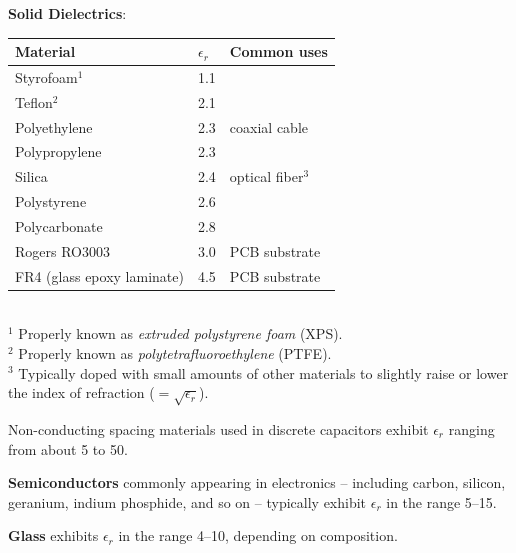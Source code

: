 \vfill\break
{\bf Solid Dielectrics}:
%
\begin{tabular}{lll}
Material                   & $\epsilon_r$ & Common uses \\
\hline
Styrofoam$^1$              & 1.1 & \\ \index{styrofoam} %
Teflon$^2$                 & 2.1 & \\ \index{Teflon} %
Polyethylene               & 2.3 & coaxial cable \index{polyethylene} \\ %
Polypropylene              & 2.3 & \\ \index{polypropylene} %
Silica                     & 2.4 & optical fiber$^3$ \index{silica} \\ %
Polystyrene                & 2.6 & \\ \index{polystyrene} %
Polycarbonate              & 2.8 & \\ \index{polycarbonate} %
Rogers RO3003              & 3.0 & PCB substrate \\ \index{printed circuit board (PCB)!material}
FR4 (glass epoxy laminate) & 4.5 & PCB substrate \index{FR4} \\ %
\end{tabular}
%
~\\
$^1$ Properly known as \emph{extruded polystyrene foam} (XPS).\\
$^2$ Properly known as \emph{polytetrafluoroethylene} (PTFE).\\ 
$^3$ Typically doped with small amounts of other materials to slightly raise or lower the index of refraction 
($=\sqrt{\epsilon_r}$).

Non-conducting spacing materials used in discrete capacitors exhibit $\epsilon_r$ ranging from about 5 to 50.

{\bf Semiconductors} 
commonly appearing in electronics -- including carbon, silicon, 
geranium, 
indium phosphide, 
and so on -- typically exhibit $\epsilon_r$ in the range 5--15.  

{\bf Glass} 
exhibits $\epsilon_r$ in the range 4--10, depending on composition.

